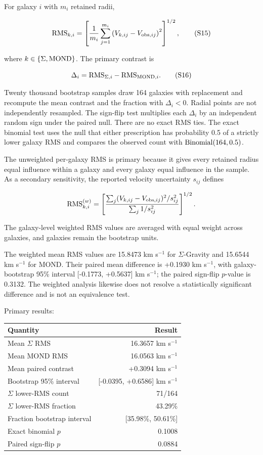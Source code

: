 \documentclass[utf8]{frontiers_suppmat}
\begin{document}
For galaxy \(i\) with \(m_i\) retained radii,

\[
{\rm RMS}_{k,i}
=\left[\frac{1}{m_i}\sum_{j=1}^{m_i}
\left(V_{k,ij}-V_{{\rm obs},ij}\right)^2\right]^{1/2},
\tag{S15}
\]

where \(k\in\{\Sigma,{\rm MOND}\}\). The primary contrast is

\[
\Delta_i={\rm RMS}_{\Sigma,i}-{\rm RMS}_{{\rm MOND},i}.
\tag{S16}
\]

Twenty thousand bootstrap samples draw 164 galaxies with replacement and recompute the mean contrast and the fraction with \(\Delta_i<0\). Radial points are not independently resampled. The sign-flip test multiplies each \(\Delta_i\) by an independent random sign under the paired null. There are no exact RMS ties. The exact binomial test uses the null that either prescription has probability 0.5 of a strictly lower galaxy RMS and compares the observed count with \({\rm Binomial}(164,0.5)\).

The unweighted per-galaxy RMS is primary because it gives every retained radius equal influence within a galaxy and every galaxy equal influence in the sample. As a secondary sensitivity, the reported velocity uncertainty \(s_{ij}\) defines

\[
{\rm RMS}^{(w)}_{k,i}
=\left[
\frac{\sum_j (V_{k,ij}-V_{{\rm obs},ij})^2/s_{ij}^2}
{\sum_j 1/s_{ij}^2}
\right]^{1/2}.
\]

The galaxy-level weighted RMS values are averaged with equal weight across galaxies, and galaxies remain the bootstrap units.

The weighted mean RMS values are 15.8473 km s\(^{-1}\) for \(\Sigma\)-Gravity and 15.6544 km s\(^{-1}\) for MOND. Their paired mean difference is +0.1930 km s\(^{-1}\), with galaxy-bootstrap 95\% interval {[}-0.1773, +0.5637{]} km s\(^{-1}\); the paired sign-flip \(p\)-value is 0.3132. The weighted analysis likewise does not resolve a statistically significant difference and is not an equivalence test.

Primary results:

\begin{longtable}[]{@{}lr@{}}
\toprule\noalign{}
Quantity & Result \\
\midrule\noalign{}
\endhead
\bottomrule\noalign{}
\endlastfoot
Mean \(\Sigma\) RMS & 16.3657 km s\(^{-1}\) \\
Mean MOND RMS & 16.0563 km s\(^{-1}\) \\
Mean paired contrast & +0.3094 km s\(^{-1}\) \\
Bootstrap 95\% interval & {[}-0.0395, +0.6586{]} km s\(^{-1}\) \\
\(\Sigma\) lower-RMS count & 71/164 \\
\(\Sigma\) lower-RMS fraction & 43.29\% \\
Fraction bootstrap interval & {[}35.98\%, 50.61\%{]} \\
Exact binomial \(p\) & 0.1008 \\
Paired sign-flip \(p\) & 0.0884 \\
\end{longtable}
\end{document}
